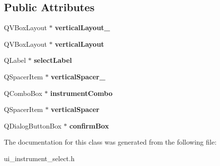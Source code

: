 \subsection*{Public Attributes}
\begin{DoxyCompactItemize}
\item 
\mbox{\label{classUi__instrument__select_a1737266d6e1af37c2d07b30341d1f1a2}} 
Q\+V\+Box\+Layout $\ast$ {\bfseries vertical\+Layout\+\_}
\item 
\mbox{\label{classUi__instrument__select_a8b1111a5196c8a0257a0cb546abee3cd}} 
Q\+V\+Box\+Layout $\ast$ {\bfseries vertical\+Layout}
\item 
\mbox{\label{classUi__instrument__select_ace60c407a49b0c7f907c1b78d5dba3a6}} 
Q\+Label $\ast$ {\bfseries select\+Label}
\item 
\mbox{\label{classUi__instrument__select_aeaacd519f8c788bea1b9eb8977e3adff}} 
Q\+Spacer\+Item $\ast$ {\bfseries vertical\+Spacer\+\_}
\item 
\mbox{\label{classUi__instrument__select_a53fd899dbd8fca7b39f8530de1c60fdd}} 
Q\+Combo\+Box $\ast$ {\bfseries instrument\+Combo}
\item 
\mbox{\label{classUi__instrument__select_afd36270c7752f99cdaa739c678cd478e}} 
Q\+Spacer\+Item $\ast$ {\bfseries vertical\+Spacer}
\item 
\mbox{\label{classUi__instrument__select_a1f2a57b75a2a7f7fff56e2b2d7137946}} 
Q\+Dialog\+Button\+Box $\ast$ {\bfseries confirm\+Box}
\end{DoxyCompactItemize}


The documentation for this class was generated from the following file\+:\begin{DoxyCompactItemize}
\item 
ui\+\_\+instrument\+\_\+select.\+h\end{DoxyCompactItemize}
